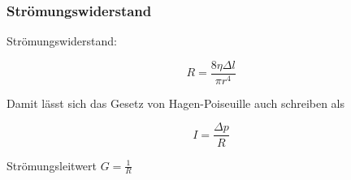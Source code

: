\documentclass{beamer}
\begin{document}

\begin{frame}
\end{frame}


\begin{frame}
\frametitle{Strömungswiderstand}

Strömungswiderstand: 

\[
R = \frac{8 \eta \Delta l}{\pi r^4}
\]

\pause

Damit lässt sich das Gesetz von Hagen-Poiseuille auch schreiben als

\[
I = \frac{\Delta p}{R}
\]

\pause

Strömungsleitwert \(G = \frac{1}{R}\)


\end{frame}
\end{document}
